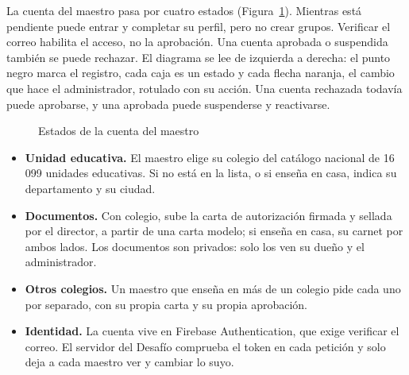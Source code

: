 La cuenta del maestro pasa por cuatro estados (Figura~\ref{fig:estados_maestro}). Mientras está pendiente puede entrar y completar su perfil, pero no crear grupos. Verificar el correo habilita el acceso, no la aprobación. Una cuenta aprobada o suspendida también se puede rechazar. El diagrama se lee de izquierda a derecha: el punto negro marca el registro, cada caja es un estado y cada flecha naranja, el cambio que hace el administrador, rotulado con su acción. Una cuenta rechazada todavía puede aprobarse, y una aprobada puede suspenderse y reactivarse.

\begin{figure}[H]
\centering
{}
\caption[Estados de la cuenta del maestro]{Estados de la cuenta del maestro}
\label{fig:estados_maestro}
\end{figure}

\begin{itemize}
    \item \textbf{Unidad educativa.} El maestro elige su colegio del catálogo nacional de 16\,099 unidades educativas. Si no está en la lista, o si enseña en casa, indica su departamento y su ciudad.
    \item \textbf{Documentos.} Con colegio, sube la carta de autorización firmada y sellada por el director, a partir de una carta modelo; si enseña en casa, su carnet por ambos lados. Los documentos son privados: solo los ven su dueño y el administrador.
    \item \textbf{Otros colegios.} Un maestro que enseña en más de un colegio pide cada uno por separado, con su propia carta y su propia aprobación.
    \item \textbf{Identidad.} La cuenta vive en Firebase Authentication, que exige verificar el correo. El servidor del Desafío comprueba el token en cada petición y solo deja a cada maestro ver y cambiar lo suyo.
\end{itemize}


